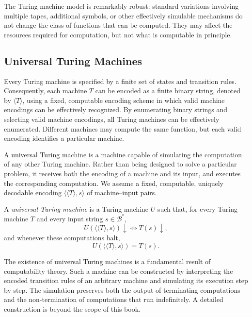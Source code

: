 The Turing machine model is remarkably robust: standard variations involving multiple tapes, additional symbols, or other effectively simulable mechanisms do not change the class of functions that can be computed. They may affect the resources required for computation, but not what is computable in principle.


\subsection*{Universal Turing Machines}

Every Turing machine is specified by a finite set of states and transition rules. Consequently, each machine $T$ can be encoded as a finite binary string, denoted by $\langle T\rangle$, using a fixed, computable encoding scheme in which valid machine encodings can be effectively recognized. By enumerating binary strings and selecting valid machine encodings, all Turing machines can be effectively enumerated. Different machines may compute the same function, but each valid encoding identifies a particular machine.

A universal Turing machine is a machine capable of simulating the computation of any other Turing machine. Rather than being designed to solve a particular problem, it receives both the encoding of a machine and its input, and executes the corresponding computation. We assume a fixed, computable, uniquely decodable encoding $\langle\langle T\rangle,s\rangle$ of machine--input pairs.

\begin{definition}
\label{def:Universal-Turing-Machine}
A \emph{universal Turing machine} is a Turing machine $U$ such that, for every Turing machine $T$ and every input string $s\in\mathcal{B}^\ast$,
\[
U(\langle\langle T\rangle,s\rangle)\downarrow
\iff T(s)\downarrow,
\]
and whenever these computations halt,
\[
U(\langle\langle T\rangle,s\rangle)=T(s).
\]
\end{definition}

The existence of universal Turing machines is a fundamental result of computability theory. Such a machine can be constructed by interpreting the encoded transition rules of an arbitrary machine and simulating its execution step by step. The simulation preserves both the output of terminating computations and the non-termination of computations that run indefinitely. A detailed construction is beyond the scope of this book.

